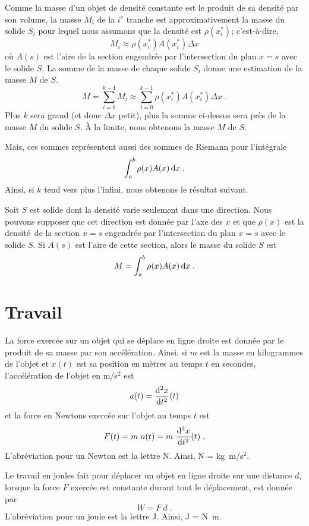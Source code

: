 {Comme la masse d'un objet de densité constante est le produit de sa densité
par son volume, la masse $M_i$ de la $i^e$ tranche est approximativement la
masse du solide $S_i$ pour lequel nous assumons que la densité est
$\rho(x_i^\ast)$; c'est-à-dire,
\[
M_i \approx \rho(x_i^\ast) A(x_i^\ast) \Delta x
\]
où $A(s)$ est l'aire de la section engendrée par l'intersection du plan $x=s$
avec le solide $S$.  La somme de la masse de chaque solide $S_i$ donne une
estimation de la masse $M$ de $S$.
\[
M = \sum_{i=0}^{k-1} M_i \approx \sum_{i=0}^{k-1}
\rho(x_i^\ast) A(x_i^\ast) \Delta x \; .
\]
Plus $k$ sera grand (et donc $\Delta x$ petit), plus la somme ci-dessus sera
près de la masse $M$ du solide $S$.  À la limite, nous obtenons la masse $M$ de
$S$.

Mais, ces sommes représentent aussi des sommes de Riemann pour l'intégrale
\[
\int_a^b \rho(x) A(x)\,\mathrm{d}x \; .
\]
Ainsi, si $k$ tend vers plus l'infini, nous obtenons le résultat suivant.

\begin{focus}{\mth} 
Soit $S$ est solide dont la densité varie seulement dans une
direction.  Nous pouvons supposer que cet direction est donnée par l'axe
des $x$ et que $\rho(x)$ est la \lgm densité\rgm\ de la section $x=s$
engendrée par l'intersection du plan $x=s$ avec le solide $S$.  Si
$A(s)$ est l'aire de cette section, alors le masse du solide $S$ est
\begin{equation}\label{comp_mass}
M = \int_a^b \rho(x)A(x)\,\mathrm{d}x \; .
\end{equation}
\end{focus}

\section{Travail \eng}

La force exercée sur un objet qui se déplace en ligne droite est donnée par
le produit de sa masse par son accélération.  Ainsi, si $m$ est la masse en
kilogrammes de l'objet et $x(t)$ est sa position en mètres au temps $t$ en
secondes, l'accélération de l'objet en m/s$^2$ est
\[
a(t) = \frac{\mathrm{d}^{2}x}{\mathrm{d}t^{2}}(t)
\]
et la force en Newtons exercée sur l'objet au temps $t$ est
\[
F(t) = m\ a(t) = m \ \frac{\mathrm{d}^{2}x}{\mathrm{d}t^{2}}(t) \; .
\]
L'abréviation pour un Newton est la lettre N.  Ainsi, N = kg\ m/s$^2$.

Le travail en joules fait pour déplacer un objet en ligne droite sur une
distance $d$, lorsque la force $F$ exercée est constante durant tout le
déplacement, est donnée par
\begin{equation} \label{force}
W = F\ d \; .
\end{equation}
L'abréviation pour un joule est la lettre J.  Ainsi, J = N\ m.

}

